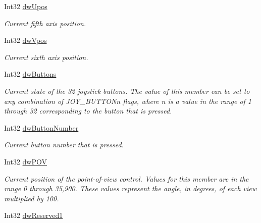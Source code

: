\begin{DoxyCompactItemize}
Int32 \hyperlink{struct_tao_1_1_platform_1_1_windows_1_1_winmm_1_1_j_o_y_i_n_f_o_e_x_aaa53c146810997488f113ec6d277b847}{dwUpos}
\begin{DoxyCompactList}\small\item\em Current fifth axis position. \item\end{DoxyCompactList}\item 
Int32 \hyperlink{struct_tao_1_1_platform_1_1_windows_1_1_winmm_1_1_j_o_y_i_n_f_o_e_x_a577e3965af18d37933333f4e93f46c67}{dwVpos}
\begin{DoxyCompactList}\small\item\em Current sixth axis position. \item\end{DoxyCompactList}\item 
Int32 \hyperlink{struct_tao_1_1_platform_1_1_windows_1_1_winmm_1_1_j_o_y_i_n_f_o_e_x_aa72d8cb67ca3577d94cee15fca075291}{dwButtons}
\begin{DoxyCompactList}\small\item\em Current state of the 32 joystick buttons. The value of this member can be set to any combination of JOY\_\-BUTTONn flags, where n is a value in the range of 1 through 32 corresponding to the button that is pressed. \item\end{DoxyCompactList}\item 
Int32 \hyperlink{struct_tao_1_1_platform_1_1_windows_1_1_winmm_1_1_j_o_y_i_n_f_o_e_x_a43c8fb6923edc2db4d3c7e03c2e03a1a}{dwButtonNumber}
\begin{DoxyCompactList}\small\item\em Current button number that is pressed. \item\end{DoxyCompactList}\item 
Int32 \hyperlink{struct_tao_1_1_platform_1_1_windows_1_1_winmm_1_1_j_o_y_i_n_f_o_e_x_a88d4785efdcf2a3b7c4bc3b9f6ad0fad}{dwPOV}
\begin{DoxyCompactList}\small\item\em Current position of the point-\/of-\/view control. Values for this member are in the range 0 through 35,900. These values represent the angle, in degrees, of each view multiplied by 100. \item\end{DoxyCompactList}\item 
Int32 \hyperlink{struct_tao_1_1_platform_1_1_windows_1_1_winmm_1_1_j_o_y_i_n_f_o_e_x_aaf8387d045e2e946f6033c3d1b6a362e}{dwReserved1}

\end{DoxyCompactItemize}
